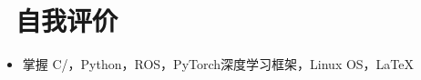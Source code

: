 \documentclass[11pt]{article}
\begin{document}


\section{\texorpdfstring{\makebox[\widthof{\faIdCard}][c]{\color{ZZU_BLUE}\faIdCard}\ 自我评价}{自我评价}}

\begin{itemize}
    \item 掌握 C/\CC，Python，ROS，PyTorch深度学习框架，Linux OS，\LaTeX
\end{itemize}

\end{document}
